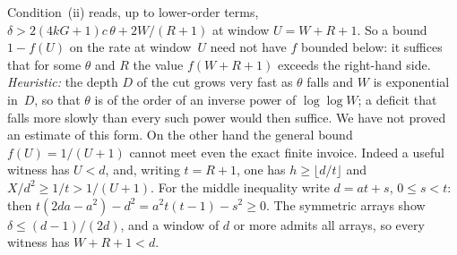 \begin{remark}\label{rem:weak-demand}
Condition~(ii) reads, up to lower-order terms, $\delta>2(4kG+1)c\,\theta+2W/(R+1)$ at window $U=W+R+1$. So a bound
$1-f(U)$ on the rate at window~$U$ need not have $f$ bounded below: it suffices that for some $\theta$ and $R$ the
value $f(W+R+1)$ exceeds the right-hand side. \emph{Heuristic:} the depth $D$ of the cut grows very fast as $\theta$
falls and $W$ is exponential in~$D$, so that $\theta$ is of the order of an inverse power of $\log\log W$; a deficit
that falls more slowly than every such power would then suffice. We have not proved an estimate of this form. On the other hand the general
bound $f(U)=1/(U+1)$ cannot meet even the exact finite invoice. Indeed a useful witness has $U<d$, and, writing
$t=R+1$, one has $h\ge\lfloor d/t\rfloor$ and $X/d^2\ge1/t>1/(U+1)$. For the middle inequality write
$d=at+s$, $0\le s<t$: then $t(2da-a^2)-d^2=a^2t(t-1)-s^2\ge0$. The symmetric arrays show
$\delta\le(d-1)/(2d)$, and a window of $d$ or more admits all arrays, so every witness has $W+R+1<d$.
\end{remark}
